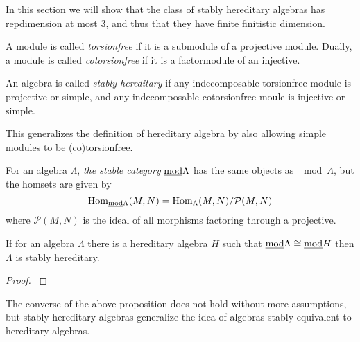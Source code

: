 In this section we will show that the class of stably hereditary algebras has repdimension at most 3, and thus that they have finite finitistic dimension.

\begin{defn}[(co)torsionfree]
	A module is called \textit{torsionfree} if it is a submodule of a projective module. Dually, a module is called \textit{cotorsionfree} if it is a factormodule of an injective.
\end{defn}

\begin{defn}
	An algebra is called \textit{stably hereditary} if any indecomposable torsionfree module is projective or simple, and any indecomposable cotorsionfree moule is injective or simple. 
\end{defn}

This generalizes the definition of hereditary algebra by also allowing simple modules to be (co)torsionfree.

\begin{defn}
	For an algebra $\Lambda$, \textit{the stable category} $\underline{\mod}\Lambda$ has the same objects as $\mod\Lambda$, but the homsets are given by $$\Hom_{\underline{\mod}\Lambda}(M, N) = \Hom_\Lambda(M,N)/\mathcal{P}(M,N)$$
	where $\mathcal{P}(M,N)$ is the ideal of all morphisms factoring through a projective.
\end{defn}

\begin{prop}
	If for an algebra $\Lambda$ there is a hereditary algebra $H$ such that $\underline{\mod}\Lambda \cong \underline{\mod}H$ then $\Lambda$ is stably hereditary.
	\begin{proof}
		\cite[Lemma~4.12]{AR91}  \cite{AR73}
	\end{proof}
\end{prop}

The converse of the above proposition does not hold without more assumptions, but stably hereditary algebras generalize the idea of algebras stably equivalent to hereditary algebras.

